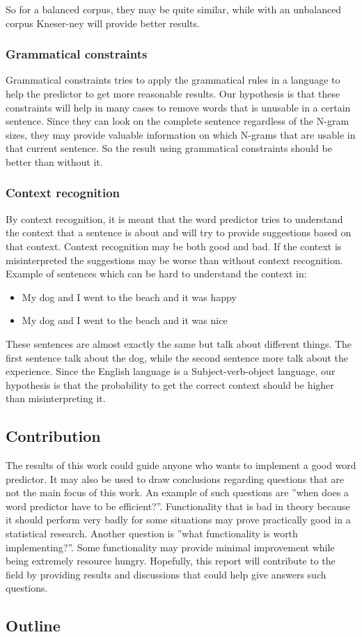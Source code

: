 So for a balanced corpus, they may be quite similar, while with an unbalanced corpus Kneser-ney will provide better results.
\subsubsection{Grammatical constraints}
Grammatical constraints tries to apply the grammatical rules in a language to help the predictor to get more reasonable results. Our hypothesis is that these constraints will help in many cases to remove words that is unusable in a certain sentence. Since they can look on the complete sentence regardless of the N-gram sizes, they may provide valuable information on which N-grams that are usable in that current sentence. So the result using grammatical constraints should be better than without it.
\subsubsection{Context recognition}
By context recognition, it is meant that the word predictor tries to understand the context that a sentence is about and will try to provide suggestions based on that context. Context recognition may be both good and bad. If the context is misinterpreted the suggestions may be worse than without context recognition. Example of sentences which can be hard to understand the context in:

\begin{itemize}
\item My dog and I went to the beach and it was happy
\item My dog and I went to the beach and it was nice
\end{itemize}
These sentences are almost exactly the same but talk about different things. The first sentence talk about the dog, while the second sentence more talk about the experience.
Since the English language is a Subject-verb-object language, our hypothesis is that the probability to get the correct context should be higher than misinterpreting it.

\subsection{Contribution}
The results of this work could guide anyone who wants to implement a good word predictor. It may also be used to draw conclusions regarding questions that are not the main focus of this work. An example of such questions are ''when does a word predictor have to be efficient?''. Functionality that is bad in theory because it should perform very badly for some situations may prove practically good in a statistical research. Another question is ''what functionality is worth implementing?''. Some functionality may provide minimal improvement while being extremely resource hungry. Hopefully, this report will contribute to the field by providing results and discussions that could help give answers such questions.

\subsection{Outline}